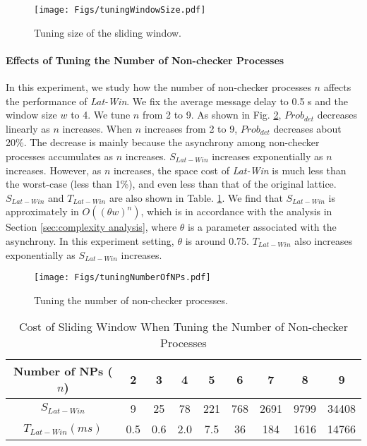 \documentclass[12pt,journal,letterpaper,compsoc]{IEEEtran}
\begin{document}
\begin{figure}[htbp]
\begin{center}
  \texttt{[image: Figs/tuningWindowSize.pdf]}\\
  \centering\parbox[c]{3in}{\caption{Tuning size of the sliding window.}}
  \label{F:window-size}
\end{center}
\end{figure}

\paragraph{Effects of Tuning the Number of Non-checker Processes}

In this experiment, we study how the number of non-checker processes $n$ affects the performance of {\it Lat-Win}. We fix the average message delay to 0.5 s and the window size $w$ to 4. We tune $n$ from 2 to 9. As shown in Fig. \ref{F:number-of-NPs}, $Prob_{det}$ decreases linearly as $n$ increases. When $n$ increases from 2 to 9, $Prob_{det}$ decreases about 20\%. The decrease is mainly because the asynchrony among non-checker processes accumulates as $n$ increases. $S_{Lat-Win}$ increases exponentially as $n$ increases. However, as $n$ increases, the space cost of {\it Lat-Win} is much less than the worst-case (less than 1\%), and even less than that of the original lattice. $S_{Lat-Win}$ and $T_{Lat-Win}$ are also shown in Table. \ref{T:cost of sliding window}. We find that $S_{Lat-Win}$ is approximately in $O((\theta w)^n)$, which is in accordance with the analysis in Section \ref{sec:complexity analysis}, where $\theta$ is a parameter associated with the asynchrony. In this experiment setting, $\theta$ is around 0.75. $T_{Lat-Win}$ also increases exponentially as $S_{Lat-Win}$ increases.

\begin{figure}[htbp]
\begin{center}
  \texttt{[image: Figs/tuningNumberOfNPs.pdf]}\\
  \centering\parbox[c]{3.9in}{\caption{Tuning the number of non-checker processes.}}
  \label{F:number-of-NPs}
\end{center}
\end{figure}

\begin{table}[htbp]
\caption{Cost of Sliding Window When Tuning the Number of Non-checker Processes}
\label{T:cost of sliding window} \centering
\begin{tabular}{c|c|c|c|c|c|c|c|c}
\hline
Number of NPs ($n$) & 2 & 3 & 4 & 5 & 6 & 7 & 8 & 9 \\
\hline
\hline
$S_{Lat-Win}$ & 9 & 25 & 78 & 221 & 768 & 2691 & 9799 & 34408 \\
\hline
$T_{Lat-Win} (ms)$ & 0.5 & 0.6 & 2.0 & 7.5 & 36 & 184 & 1616 & 14766 \\
\hline
\end{tabular}
\end{table}
\end{document}
